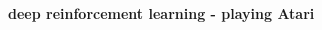 \documentclass{beamer}
\begin{document}
\begin{frame}{\bf deep reinforcement learning - playing Atari}

  \begin{columns}

    \begin{column}{0.5\textwidth}
    \end{column}


\end{columns}
\end{frame}
\end{document}
